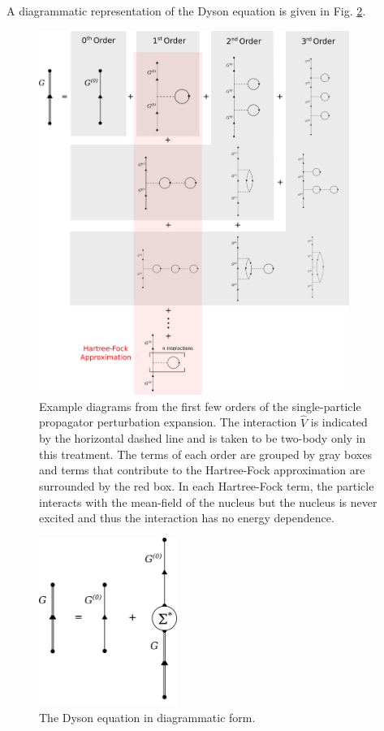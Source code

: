 \noindent
A diagrammatic representation of the Dyson equation is given in Fig. \ref{DysonEquationDiagram}.
\begin{figure}[tb]
    \centering
    \includegraphics[width=0.9\textwidth]{figures/SecondOrder.png}
    \caption[The single-particle propagator perturbation expansion, to second order]
    {
        Example diagrams from the first few orders of the 
        single-particle propagator perturbation expansion.
        The interaction $\hat{V}$ is indicated by the horizontal
        dashed line and is taken to be two-body only in this treatment.
        The terms of each order are grouped by gray boxes and terms that contribute to
        the Hartree-Fock approximation are surrounded by the red box. In each Hartree-Fock
        term, the particle interacts with the mean-field of the nucleus but
        the nucleus is never excited and thus the interaction has no energy dependence.
    }
    \label{PerturbationExpansionDiagram}
\end{figure}

\begin{figure}[tb]
    \centering
    \includegraphics[width=0.4\textwidth]{figures/DysonEquation.png}
    \caption{The Dyson equation in diagrammatic form.}
    \label{DysonEquationDiagram}
\end{figure}

